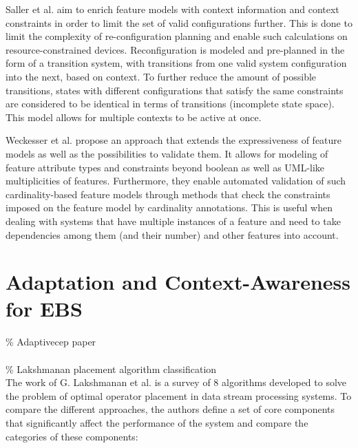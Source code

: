 Saller et al. aim to enrich feature models with context information and context constraints in order to limit the set of valid configurations further. This is done to limit the complexity of re-configuration planning and enable such calculations on resource-constrained devices. Reconfiguration is modeled and pre-planned in the form of a transition system, with transitions from one valid system configuration into the next, based on context. To further reduce the amount of possible transitions, states with different configurations that satisfy the same constraints are considered to be identical in terms of transitions (incomplete state space). This model allows for multiple contexts to be active at once.

Weckesser et al. propose an approach that extends the expressiveness of feature models as well as the possibilities to validate them. It allows for modeling  of feature attribute types and constraints beyond boolean as well as UML-like multiplicities of features. Furthermore, they enable automated validation of such cardinality-based feature models through methods that check the constraints imposed on the feature model by cardinality annotations. This is useful when dealing with systems that have multiple instances of a feature and need to take dependencies among them (and their number) and other features into account.

\section{Adaptation and Context-Awareness for EBS}
\% Adaptive\gls{cep} paper\\ \\


\% Lakshmanan placement algorithm classification \\
The work of G. Lakshmanan et al. \cite{Lakshmanan2008} is a survey of 8 algorithms developed to solve the problem of optimal operator placement in data stream processing systems. To compare the different approaches, the authors define a set of core components that significantly affect the performance of the system and compare the categories of these components: 

